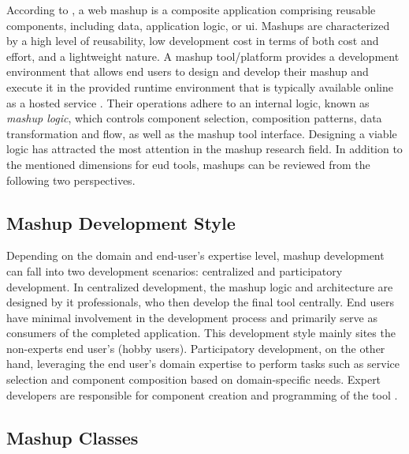 According to \autocite{Daniel2014}, a web mashup is a composite
application comprising reusable components, including data, application
logic, or \gls{ui}. Mashups are characterized by a high level of reusability,
low development cost in terms of both cost and effort, and a lightweight
nature. A mashup tool/platform provides a development environment that
allows end users to design and develop their mashup and execute it in
the provided runtime environment that is typically available online as
a hosted service \autocite{Soi2014a}. Their operations adhere to
an internal logic, known as \emph{mashup logic}, which controls component
selection, composition patterns, data transformation and flow, as well as
the mashup tool interface. Designing a viable logic has attracted the most
attention in the mashup research field. In addition to the mentioned
dimensions for \gls{eud} tools, mashups can be reviewed from the following
two perspectives.


\vspace{-15pt}
\hypertarget{sec:mashup-style}{%
\subsection{Mashup Development Style}\label{sec:mashup-style}}
\vspace{15pt}

Depending on the domain and end-user’s expertise level, mashup development can fall into two development scenarios: centralized and participatory development. In centralized development, the mashup logic and architecture are designed by \gls{it} professionals, who then develop the final tool centrally. End users have minimal involvement in the development process and primarily serve as consumers of the completed application. This development style mainly sites the non-experts end user’s (hobby users). Participatory development, on the other hand, leveraging the end user’s domain expertise to perform tasks such as service selection and component composition based on domain-specific needs. Expert developers are responsible for component creation and programming of the tool \autocite{Daniel2014}.

\vspace{-10pt}
\hypertarget{sec:mashup-class}{%
\subsection{Mashup Classes}\label{sec:mashup-class}}
\vspace{10pt}

